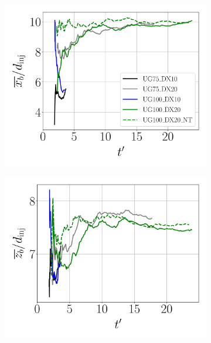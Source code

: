 \begin{figure}[ht]
\flushleft
\begin{subfigure}[b]{0.3\textwidth}
	\flushleft
   \includegraphics[scale=0.225]{./part2_developments/figures_ch5_resolved_JICF/results_dense_core_modeling/convergence_mean_xb}
\end{subfigure}
\hfill
\begin{subfigure}[b]{0.3\textwidth}
	\flushleft
   \includegraphics[scale=0.225]{./part2_developments/figures_ch5_resolved_JICF/results_dense_core_modeling/convergence_mean_zb}
\end{subfigure}

\end{figure}
